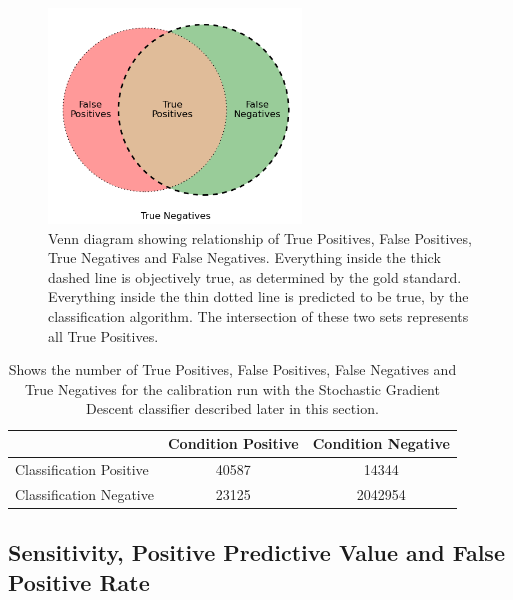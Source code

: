 \documentclass[pdftex,12pt,a4paper]{report}
\begin{document}
\begin{figure}[hb!]
    \centering
    \includegraphics[width=0.6\textwidth]{figures/tf_np_venn_cropped}
    \vspace{-10pt}
    \caption{Venn diagram showing relationship of True Positives, False Positives, True Negatives and
        False Negatives. Everything inside the thick dashed line is objectively true, as determined
        by the gold standard. Everything inside the thin dotted line is predicted to be true, by the
        classification algorithm. The intersection of these two sets represents all True Positives.}
    \label{fig:tf_np_venn}
    \vspace{-10pt}
\end{figure}

\begin{table}[hb!]
    \centering
    \begin{tabular}{ l | c c }
                                & Condition Positive & Condition Negative \\
        \hline
        Classification Positive & \SI{40587}{} & \SI{14344}{} \\
        Classification Negative & \SI{23125}{} & \SI{2042954}{} \\
    \end{tabular}
    \caption{Shows the number of True Positives, False Positives, False Negatives and True Negatives
        for the calibration run with the Stochastic Gradient Descent classifier described later in this
        section. }
    \label{tab:tf_np_table}
\end{table}

\newpage
\subsection{Sensitivity, Positive Predictive Value and False Positive Rate}
\end{document}
